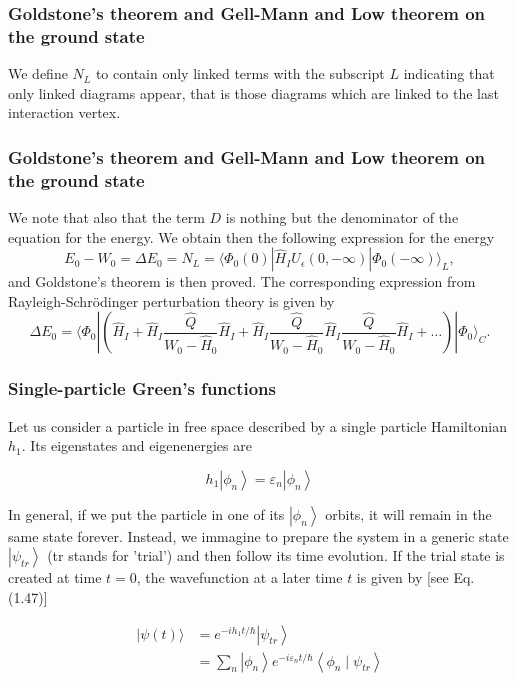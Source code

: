 \documentclass[compress]{beamer}
\newcommand*{\ket}[1]{|#1\rangle}
\newcommand*{\bra}[1]{\langle#1|}
\begin{document}
\frame
{
\frametitle{Goldstone's theorem and Gell-Mann and Low theorem on the ground state}
\begin{small}
{\scriptsize
We define  $N_L$ to contain only linked terms
with the subscript $L$ indicating that only linked diagrams appear, that is those diagrams which are linked to the last interaction vertex.
}
\end{small}
}
\frame
{
\frametitle{Goldstone's theorem and Gell-Mann and Low theorem on the ground state}
\begin{small}
{\scriptsize
We note that also that the term $D$ is nothing but the denominator of the equation for the energy. We obtain then the following expression for the energy
\[
E_0-W_0=\Delta E_0=N_L= \bra{\Phi_0(0)}\hat{H}_IU_{\epsilon}(0,-\infty )\ket{\Phi_0(-\infty)}_L,
\]
and Goldstone's theorem is then proved. 
The corresponding expression from Rayleigh-Schr\"odinger perturbation theory is given by
\[
\Delta E_0=\langle \Phi_0|\left(\hat{H}_I+\hat{H}_I\frac{\hat{Q}}{W_0-\hat{H}_0}\hat{H}_I+
\hat{H}_I\frac{\hat{Q}}{W_0-\hat{H}_0}\hat{H}_I\frac{\hat{Q}}{W_0-\hat{H}_0}\hat{H}_I+\dots\right)|\Phi_0\rangle_C.
\]
}
\end{small}
}



\frame
{
\frametitle{Single-particle Green's functions}
\begin{small}
{\scriptsize
Let us consider a particle in free space described by a single particle Hamiltonian $h_{1}$. Its eigenstates and eigenenergies are

$$
h_{1}\left|\phi_{n}\right\rangle=\varepsilon_{n}\left|\phi_{n}\right\rangle
$$

In general, if we put the particle in one of its $\left|\phi_{n}\right\rangle$ orbits, it will remain in the same state forever. Instead, we immagine to prepare the system in a generic state $\left|\psi_{t r}\right\rangle$ (tr stands for 'trial') and then follow its time evolution. If the trial state is created at time $t=0$, the wavefunction at a later time $t$ is given by [see Eq. (1.47)]

$$
\begin{aligned}
|\psi(t)\rangle & =e^{-i h_{1} t / \hbar}\left|\psi_{t r}\right\rangle \\
& =\sum_{n}\left|\phi_{n}\right\rangle e^{-i \varepsilon_{n} t / \hbar}\left\langle\phi_{n} \mid \psi_{t r}\right\rangle
\end{aligned}
$$

}
\end{small}
}
\end{document}
